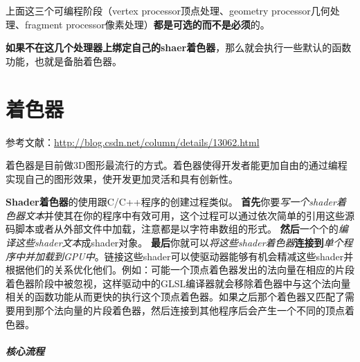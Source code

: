 \documentclass[UTF8,a4paper,8pt]{ctexbook}
\begin{document}
		上面这三个可编程阶段（vertex processor顶点处理、geometry processor几何处理、fragment processor像素处理）\textbf{都是可选的而不是必须}的。
		
		\textbf{如果不在这几个处理器上绑定自己的shaer着色器}，那么就会执行一些默认的函数功能，也就是备胎着色器。
		  
	\section{着色器}
		参考文献：\url{http://blog.csdn.net/column/details/13062.html}
		
		着色器是目前做3D图形最流行的方式。着色器使得开发者能更加自由的通过编程实现自己的图形效果，使开发更加灵活和具有创新性。
			
		\textbf{Shader着色器}的使用跟C/C++程序的创建过程类似。
		\textbf{首先}你要\textit{写一个shader着色器文本}并使其在你的程序中有效可用，这个过程可以通过依次简单的引用这些源码脚本或者从外部文件中加载，注意都是以字符串数组的形式。
		\textbf{然后}一个个的\textit{编译这些shader文本}成shader对象。
		\textbf{最后}你就可以\textit{将这些shader着色器}\textbf{连接到}\textit{单个程序中并加载到GPU中}。链接这些shader可以使驱动器能够有机会精减这些shader并根据他们的关系优化他们。例如：可能一个顶点着色器发出的法向量在相应的片段着色器阶段中被忽视，这样驱动中的GLSL编译器就会移除着色器中与这个法向量相关的函数功能从而更快的执行这个顶点着色器。如果之后那个着色器又匹配了需要用到那个法向量的片段着色器，然后连接到其他程序后会产生一个不同的顶点着色器。  

		\subparagraph{核心流程}
		
\end{document}
